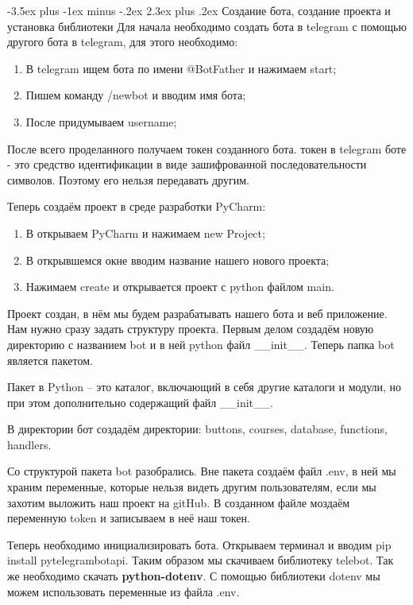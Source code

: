 \documentclass[12pt, oldlfont, amsfonts]{report}
\makeatletter
\renewcommand{\section}{\@startsection{section}{1}{0pt}%
                                {-3.5ex plus -1ex minus -.2ex}%
                                {2.3ex plus .2ex}%
{\centering\hyphenpenalty=10000\normalfont\Large\bfseries}}
\makeatother
\begin{document}
\section{Создание бота, создание проекта и установка библиотеки}
Для начала необходимо создать бота в telegram с помощью другого бота в telegram, для этого необходимо: 

\begin{enumerate}
\item В telegram ищем бота по имени  @BotFather и нажимаем start;
\item Пишем команду /newbot и вводим имя бота;
\item После придумываем username;
\end{enumerate}	

После всего проделанного получаем токен созданного бота. токен в telegram боте - это средство идентификации в виде зашифрованной последовательности символов. Поэтому его нельзя передавать другим.

Теперь создаём проект в среде разработки PyCharm:
\begin{enumerate}
\item В открываем PyCharm и нажимаем new Project;
\item В открывшемся окне вводим название нашего нового проекта;
\item Нажимаем create и открывается проект с python файлом main.
\end{enumerate}

Проект создан, в нём мы будем разрабатывать нашего бота и веб приложение. Нам нужно сразу задать структуру проекта. Первым делом создадём новую директорию с названием bot и в ней python файл \_\_init\_\_. Теперь папка bot является пакетом.

Пакет в Python – это каталог, включающий в себя другие каталоги и модули, но при этом дополнительно содержащий файл \_\_init\_\_.

В директории бот создадём директории: buttons, courses, database, functions, handlers.

Со структурой пакета bot разобрались. Вне пакета создаём файл .env, в ней мы храним переменные, которые нельзя видеть другим пользователям, если мы захотим выложить наш проект на gitHub. В созданном файле моздаём переменную token и записываем в неё наш токен. 

Теперь необходимо инициализировать бота. Открываем терминал и вводим pip install pytelegrambotapi. Таким образом мы скачиваем библиотеку telebot. Так же необходимо скачать {\bf python-dotenv}. С помощью библиотеки dotenv мы можем использовать переменные из файла { .env}.
\end{document}
